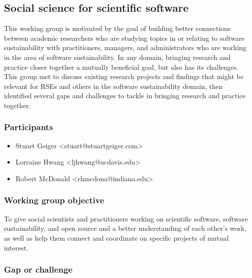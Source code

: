 \subsection{Social science for scientific software}
\label{sec:social}



This working group is motivated by the goal of building better connections between academic researchers who are studying topics in or relating to software sustainability with practitioners, managers, and administrators who are working in the area of software sustainability. In any domain, bringing research and practice closer together a mutually beneficial goal, but also has its challenges. This group met to discuss existing research projects and findings that might be relevant for RSEs and others in the software sustainability domain, then identified several gaps and challenges to tackle in bringing research and practice together.

\subsubsection{Participants}

\begin{itemize}
  \item Stuart Geiger <stuart@stuartgeiger.com>
  \item Lorraine Hwang <ljhwang@ucdavis.edu>
  \item Robert McDonald <rhmcdona@indiana.edu>
\end{itemize}

\subsubsection{Working group objective}

To give social scientists and practitioners working on scientific software, software sustainability, and open source and a better understanding of each other's work, as well as help them connect and coordinate on specific projects of mutual interest.

\subsubsection{Gap or challenge}

